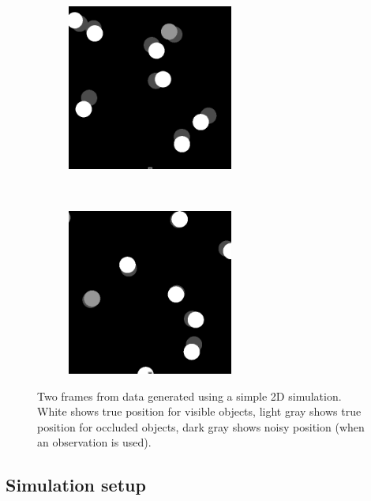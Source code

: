 \documentclass[a4paper]{article}
\begin{document}
\begin{figure}[t]
  \centering
  \begin{subfigure}{0.48\textwidth}
  \centering
  \includegraphics[width=0.6\textwidth]{images/input_1.png}
  \end{subfigure}~
  \begin{subfigure}{0.48\textwidth}
  \centering
  \includegraphics[width=0.6\textwidth]{images/input_2.png}
  \end{subfigure}
  \caption{Two frames from data generated using a simple 2D simulation.
           White shows true position for visible objects,
           light gray shows true position for occluded objects,
           dark gray shows noisy position (when an observation is used).}
  \label{fig:input}
\end{figure}

\subsection{Simulation setup}
\end{document}
